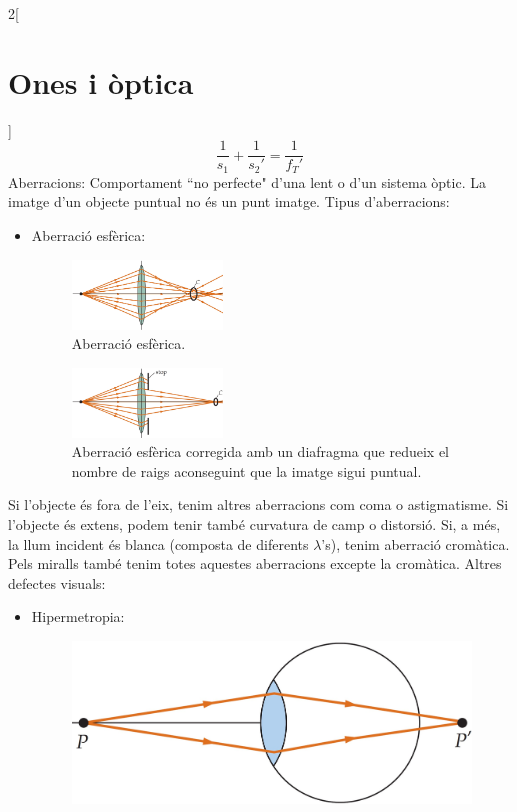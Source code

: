 \documentclass[class=article,10pt,crop=false]{standalone}
\begin{document}
\begin{multicols}{2}[\section{Ones i òptica}]
$$\frac{1}{s_1}+\frac{1}{s_2'}=\frac{1}{f_T'}$$
Aberracions: Comportament ``no perfecte" d'una lent o d'un sistema òptic. La imatge d'un objecte puntual no és un punt imatge.
Tipus d'aberracions:
\begin{itemize}
    \item Aberració esfèrica:\newline
    \begin{figure}
       \centering \includegraphics[width=4cm]{Physics/1st/Ones_i_optica/Imatges/aberr1.jpg}
        \caption{Aberració esfèrica.}
    \end{figure}
    \begin{figure}
       \centering \includegraphics[width=4cm]{Physics/1st/Ones_i_optica/Imatges/aberr2.jpg} 
        \caption{Aberració esfèrica corregida amb un diafragma que redueix el nombre de raigs aconseguint que la imatge sigui puntual.}   
    \end{figure}
\end{itemize} 
    Si l'objecte és fora de l'eix, tenim altres aberracions com coma o astigmatisme.\newline 
    Si l'objecte és extens, podem tenir també curvatura de camp o distorsió.\newline 
Si, a més, la llum incident és blanca (composta de diferents $\lambda$'s), tenim aberració cromàtica.\newline
Pels miralls també tenim totes aquestes aberracions excepte la cro\-mà\-ti\-ca.\newline
Altres defectes visuals:
\begin{itemize}
    \item Hipermetropia:\newline
    \begin{figure}[ht]
        \includegraphics[width=\linewidth]{Physics/1st/Ones_i_optica/Imatges/hip.jpg} 

\end{figure}
\end{itemize}
\end{multicols}
\end{document}

